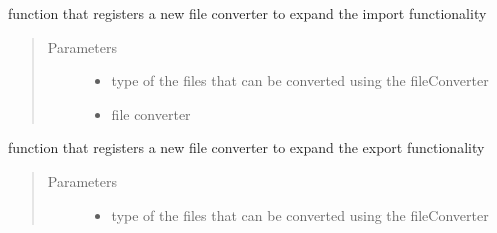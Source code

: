 \documentclass[letterpaper,10pt,english]{sphinxmanual}
\begin{document}
\begin{fulllineitems}
\begin{fulllineitems}
\begin{quote}
\begin{description}
\end{description}\end{quote}

\end{fulllineitems}


\begin{fulllineitems}
\label{\detokenize{eventLogConverter:eventLogConverter.fileUtility.FileUtilityBase.registerImport}}
function that registers a new file converter to expand the import functionality
\begin{quote}\begin{description}
\item[{Parameters}] \leavevmode\begin{itemize}
\item {} 
 \textendash{} type of the files that can be converted using the fileConverter

\item {} 
 \textendash{} file converter

\end{itemize}

\end{description}\end{quote}

\end{fulllineitems}


\begin{fulllineitems}
\label{\detokenize{eventLogConverter:eventLogConverter.fileUtility.FileUtilityBase.registerExport}}
function that registers a new file converter to expand the export functionality
\begin{quote}\begin{description}
\item[{Parameters}] \leavevmode\begin{itemize}
\item {} 
 \textendash{} type of the files that can be converted using the fileConverter


\end{itemize}
\end{description}
\end{quote}
\end{fulllineitems}
\end{fulllineitems}
\end{document}
